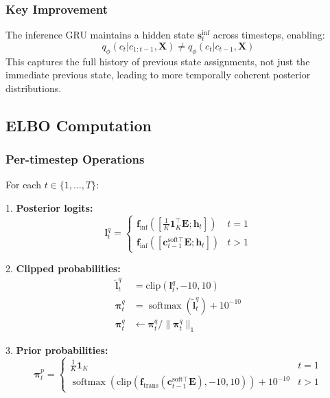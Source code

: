 \documentclass[11pt]{article}
\DeclareMathOperator{\softmax}{softmax}
\begin{document}
\subsubsection{Key Improvement}
The inference GRU maintains a hidden state $\mathbf{s}_t^{\text{inf}}$ across timesteps, enabling:
\begin{equation}
q_\phi(c_t | c_{1:t-1}, \mathbf{X}) \neq q_\phi(c_t | c_{t-1}, \mathbf{X})
\end{equation}
This captures the full history of previous state assignments, not just the immediate previous state, leading to more temporally coherent posterior distributions.


\subsection{ELBO Computation}

\subsubsection{Per-timestep Operations}
For each $t \in \{1, \ldots, T\}$:

1. \textbf{Posterior logits:}
\begin{equation}
\mathbf{l}_t^q = \begin{cases}
\mathbf{f}_{\text{inf}}([\frac{1}{K}\mathbf{1}_K^\top \mathbf{E}; \mathbf{h}_t]) & t = 1 \\
\mathbf{f}_{\text{inf}}([\mathbf{c}_{t-1}^{\text{soft}\top} \mathbf{E}; \mathbf{h}_t]) & t > 1
\end{cases}
\end{equation}

2. \textbf{Clipped probabilities:}
\begin{align}
\tilde{\mathbf{l}}_t^q &= \text{clip}(\mathbf{l}_t^q, -10, 10) \\
\bm{\pi}_t^q &= \softmax(\tilde{\mathbf{l}}_t^q) + 10^{-10} \\
\bm{\pi}_t^q &\leftarrow \bm{\pi}_t^q / \|\bm{\pi}_t^q\|_1
\end{align}

3. \textbf{Prior probabilities:}
\begin{equation}
\bm{\pi}_t^p = \begin{cases}
\frac{1}{K}\mathbf{1}_K & t = 1 \\
\softmax(\text{clip}(\mathbf{f}_{\text{trans}}(\mathbf{c}_{t-1}^{\text{soft}\top} \mathbf{E}), -10, 10)) + 10^{-10} & t > 1
\end{cases}
\end{equation}
\end{document}
